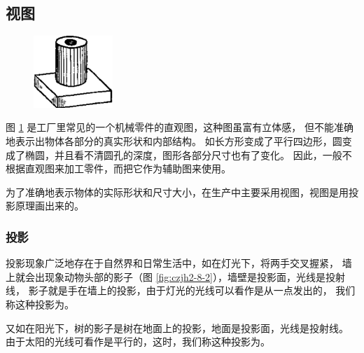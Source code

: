 \subsection{视图}\label{subsec:czjh2-8-1}

\begin{figure}
    \centering
    \includegraphics[width=3cm]{../pic/czjh2-ch8-01.png}
    \caption{}\label{fig:czjh2-8-1}
\end{figure}

图 \ref{fig:czjh2-8-1} 是工厂里常见的一个机械零件的直观图，这种图虽富有立体感，
但不能准确地表示出物体各部分的真实形状和内部结构。
如长方形变成了平行四边形，圆变成了椭圆，并且看不清圆孔的深度，图形各部分尺寸也有了变化。
因此，一般不根据直观图来加工零件，而把它作为辅助图来使用。

为了准确地表示物体的实际形状和尺寸大小，在生产中主要采用视图，视图是用投影原理画出来的。

\subsubsection{投影}

投影现象广泛地存在于自然界和日常生活中，如在灯光下，将两手交叉握紧，
墙上就会出现象动物头部的影子（图 \ref{fig:czjh2-8-2}），墙壁是投影面，光线是投射线，
影子就是手在墙上的投影，由于灯光的光线可以看作是从一点发出的，
我们称这种投影为。

又如在阳光下，树的影子是树在地面上的投影，地面是投影面，光线是投射线。
由于太阳的光线可看作是平行的，这时，我们称这种投影为。

